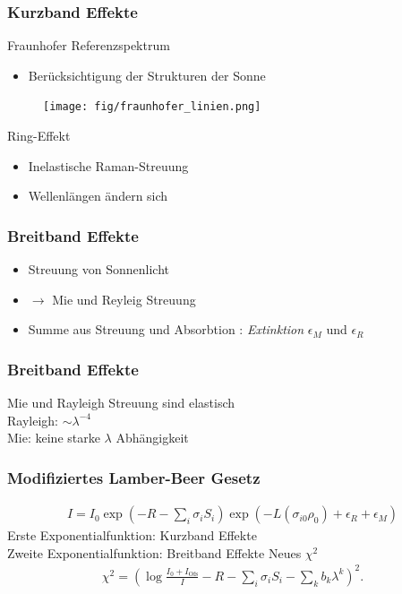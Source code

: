 \documentclass{beamer}
\begin{document}
\begin{frame}
    \frametitle{Kurzband Effekte}
Fraunhofer Referenzspektrum
    \begin{itemize}
        \item Berücksichtigung der Strukturen der Sonne
    \end{itemize}
    \begin{figure}[h]
        \texttt{[image: fig/fraunhofer\_linien.png]}
    \end{figure}
\pause
    Ring-Effekt
    \begin{itemize}
        \item Inelastische Raman-Streuung
        \item Wellenlängen ändern sich
    \end{itemize}
\end{frame}

\begin{frame}
    \frametitle{Breitband Effekte}
    \begin{itemize}
        \item Streuung von Sonnenlicht 
        \item $\to$ Mie und Reyleig Streuung
        \item Summe aus Streuung und Absorbtion : \textit{Extinktion} $\epsilon_M$ und $\epsilon_R$
    \end{itemize}
\end{frame}

\begin{frame}
    \frametitle{Breitband Effekte}
    Mie und Rayleigh Streuung sind elastisch\\
    Rayleigh: $\sim \lambda^{-4}$\\
    Mie: keine starke $\lambda$ Abhängigkeit
\end{frame}

\begin{frame}
    \frametitle{Modifiziertes Lamber-Beer Gesetz}
    \begin{align}
        I = I_0 \exp(-R - \sum_i \sigma_i S_i) \exp (-L (\sigma_{i0}\rho_0) + \epsilon_R + \epsilon_M)
    \end{align}
    Erste Exponentialfunktion: Kurzband Effekte\\
    Zweite Exponentialfunktion: Breitband Effekte
    \pause
    Neues $\chi^2$
    \begin{align}
        \chi^2 = ( \log\frac{I_0 + I_\text{Ofs}}{I} - R - \sum_i \sigma_i S_i - \sum_k b_k \lambda^k )^2.
    \end{align}
\end{frame}
\end{document}
